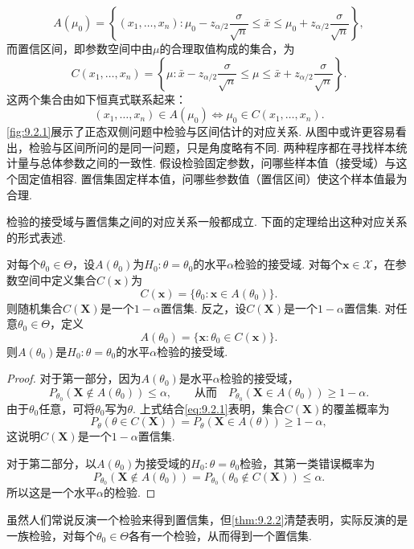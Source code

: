 $$A(\mu_0)=\left\{(x_1,\ldots,x_n):\mu_0-z_{\alpha/2}\frac\sigma{\sqrt n}\le\bar x\le\mu_0+z_{\alpha/2}\frac\sigma{\sqrt n}\right\},$$
而置信区间，即参数空间中由$\mu$的合理取值构成的集合，为
$$C(x_1,\ldots,x_n)=\left\{\mu:\bar x-z_{\alpha/2}\frac\sigma{\sqrt n}\le\mu\le\bar x+z_{\alpha/2}\frac\sigma{\sqrt n}\right\}.$$
这两个集合由如下恒真式联系起来：
$$(x_1,\ldots,x_n)\in A(\mu_0)\iff\mu_0\in C(x_1,\ldots,x_n).$$
\autoref{fig:9.2.1}展示了正态双侧问题中检验与区间估计的对应关系. 从图中或许更容易看出，检验与区间所问的是同一问题，只是角度略有不同. 两种程序都在寻找样本统计量与总体参数之间的一致性. 假设检验固定参数，问哪些样本值（接受域）与这个固定值相容. 置信集固定样本值，问哪些参数值（置信区间）使这个样本值最为合理.

检验的接受域与置信集之间的对应关系一般都成立. 下面的定理给出这种对应关系的形式表述.
\begin{theorem}\label{thm:9.2.2}
对每个$\theta_0\in\Theta$，设$A(\theta_0)$为$H_0:\theta=\theta_0$的水平$\alpha$检验的接受域. 对每个$\boldsymbol x\in\mathcal X$，在参数空间中定义集合$C(\boldsymbol x)$为
\begin{equation}\label{eq:9.2.1}
C(\boldsymbol x)=\{\theta_0:\boldsymbol x\in A(\theta_0)\}.
\end{equation}
则随机集合$C(\boldsymbol X)$是一个$1-\alpha$置信集. 反之，设$C(\boldsymbol X)$是一个$1-\alpha$置信集. 对任意$\theta_0\in\Theta$，定义
$$A(\theta_0)=\{\boldsymbol x:\theta_0\in C(\boldsymbol x)\}.$$
则$A(\theta_0)$是$H_0:\theta=\theta_0$的水平$\alpha$检验的接受域.
\end{theorem}
\begin{proof}
对于第一部分，因为$A(\theta_0)$是水平$\alpha$检验的接受域，
$$P_{\theta_0}(\boldsymbol X\notin A(\theta_0))\le\alpha,\qquad\text{从而}\quad P_{\theta_0}(\boldsymbol X\in A(\theta_0))\ge1-\alpha.$$
由于$\theta_0$任意，可将$\theta_0$写为$\theta$. 上式结合\eqref{eq:9.2.1}表明，集合$C(\boldsymbol X)$的覆盖概率为
$$P_\theta(\theta\in C(\boldsymbol X))=P_\theta(\boldsymbol X\in A(\theta))\ge1-\alpha,$$
这说明$C(\boldsymbol X)$是一个$1-\alpha$置信集.

对于第二部分，以$A(\theta_0)$为接受域的$H_0:\theta=\theta_0$检验，其第一类错误概率为
$$P_{\theta_0}(\boldsymbol X\notin A(\theta_0))=P_{\theta_0}(\theta_0\notin C(\boldsymbol X))\le\alpha.$$
所以这是一个水平$\alpha$的检验.
\end{proof}
虽然人们常说反演一个检验来得到置信集，但\autoref{thm:9.2.2}清楚表明，实际反演的是一族检验，对每个$\theta_0\in\Theta$各有一个检验，从而得到一个置信集.

